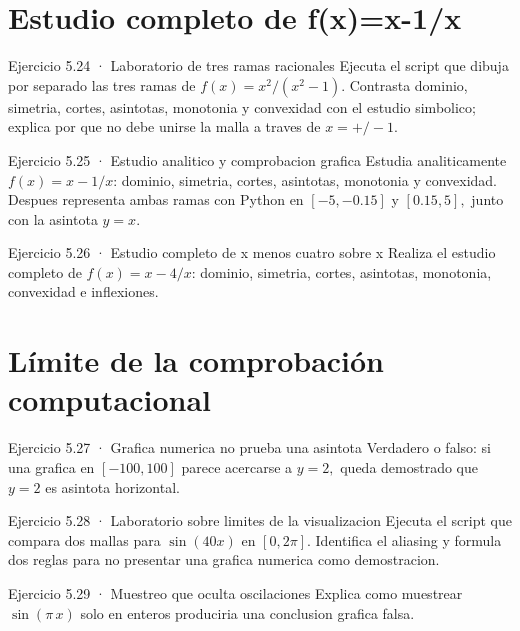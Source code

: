 \documentclass[10pt,a4paper,oneside,openany]{book}
\begin{document}
\section{Estudio completo de f(x)=x-1/x}
\begin{PSevenExerciseFixed}{Ejercicio 5.24 · Laboratorio de tres ramas racionales}
Ejecuta el script que dibuja por separado las tres ramas de \(f(x)=x^{2}/(x^{2}-1)\). Contrasta dominio, simetria, cortes, asintotas, monotonia y convexidad con el estudio simbolico; explica por que no debe unirse la malla a traves de \(x=+/-1\).
\end{PSevenExerciseFixed}
\begin{PSevenExerciseFixed}{Ejercicio 5.25 · Estudio analitico y comprobacion grafica}
Estudia analiticamente \(f(x)=x-1/x\): dominio, simetria, cortes, asintotas, monotonia y convexidad. Despues representa ambas ramas con Python en \([-5,-0.15]\) y \([0.15,5],\) junto con la asintota \(y=x\).
\end{PSevenExerciseFixed}
\begin{PSevenExerciseFixed}{Ejercicio 5.26 · Estudio completo de x menos cuatro sobre x}
Realiza el estudio completo de \(f(x)=x-4/x\): dominio, simetria, cortes, asintotas, monotonia, convexidad e inflexiones.
\end{PSevenExerciseFixed}
\section{Límite de la comprobación computacional}
\begin{PSevenExerciseFixed}{Ejercicio 5.27 · Grafica numerica no prueba una asintota}
Verdadero o falso: si una grafica en \([-100,100]\) parece acercarse a \(y=2,\) queda demostrado que \(y=2\) es asintota horizontal.
\end{PSevenExerciseFixed}
\begin{PSevenExerciseFixed}{Ejercicio 5.28 · Laboratorio sobre limites de la visualizacion}
Ejecuta el script que compara dos mallas para \(\sin(40x)\) en \([0,2\pi ]\). Identifica el aliasing y formula dos reglas para no presentar una grafica numerica como demostracion.
\end{PSevenExerciseFixed}
\begin{PSevenExerciseFixed}{Ejercicio 5.29 · Muestreo que oculta oscilaciones}
Explica como muestrear \(\sin(\pi \,x)\) solo en enteros produciria una conclusion grafica falsa.
\end{PSevenExerciseFixed}
\end{document}
